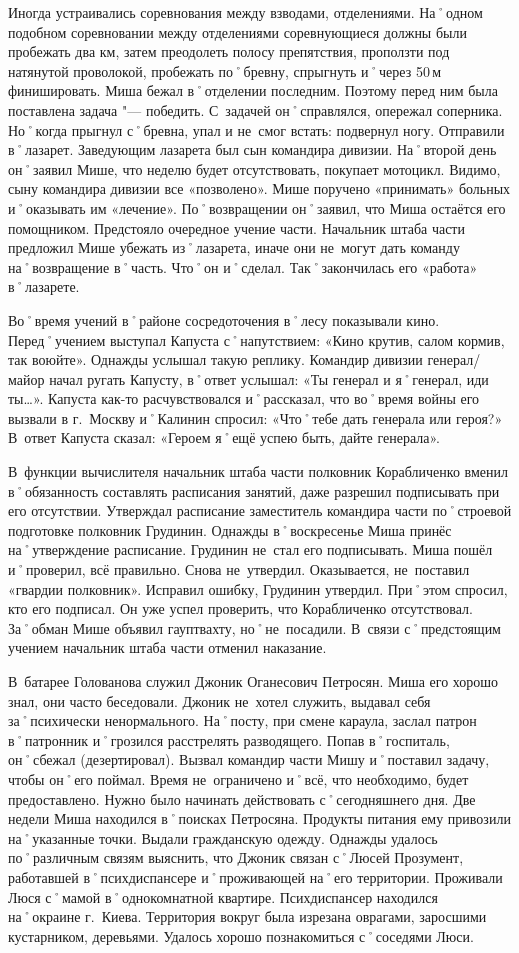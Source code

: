 Иногда устраивались соревнования между взводами, отделениями. На˚одном подобном соревновании между отделениями соревнующиеся должны были пробежать два км, затем преодолеть полосу препятствия, проползти под натянутой проволокой, пробежать по˚бревну, спрыгнуть и˚через 50\,м финишировать. Миша бежал в˚отделении последним. Поэтому перед ним была поставлена задача "--- победить. С~задачей он˚справлялся, опережал соперника. Но˚когда прыгнул с˚бревна, упал и не~смог встать: подвернул ногу. Отправили в˚лазарет. Заведующим лазарета был сын командира дивизии. На˚второй день он˚заявил Мише, что неделю будет отсутствовать, покупает мотоцикл. Видимо, сыну командира дивизии все «позволено». Мише поручено «принимать» больных и˚оказывать им «лечение». По˚возвращении он˚заявил, что Миша остаётся его помощником. Предстояло очередное учение части. Начальник штаба части предложил Мише убежать из˚лазарета, иначе они не~могут дать команду на˚возвращение в˚часть. Что˚он и˚сделал. Так˚закончилась его «работа» в˚лазарете.

Во˚время учений в˚районе сосредоточения в˚лесу показывали кино. Перед˚учением выступал Капуста с˚напутствием: «Кино крутив, салом кормив, так воюйте». Однажды услышал такую реплику. Командир дивизии генерал\-/майор начал ругать Капусту, в˚ответ услышал: «Ты генерал и я˚генерал, иди ты…». Капуста как-то расчувствовался и˚рассказал, что во˚время войны его вызвали в г.~Москву и˚Калинин спросил: «Что˚тебе дать генерала или героя?» В~ответ Капуста сказал: «Героем я˚ещё успею быть, дайте генерала». 

В~функции вычислителя начальник штаба части полковник Корабличенко вменил в˚обязанность составлять расписания занятий, даже разрешил подписывать при его отсутствии. Утверждал расписание заместитель командира части по˚строевой подготовке полковник Грудинин. Однажды в˚воскресенье Миша принёс на˚утверждение расписание. Грудинин не~стал его подписывать. Миша пошёл и˚проверил, всё правильно. Снова не~утвердил. Оказывается, не~поставил «гвардии полковник». Исправил ошибку, Грудинин утвердил. При˚этом спросил, кто его подписал. Он уже успел проверить, что Корабличенко отсутствовал. За˚обман Мише объявил гауптвахту, но˚не~посадили. В~связи с˚предстоящим учением начальник штаба части отменил наказание.


В~батарее Голованова служил Джоник Оганесович Петросян. Миша его хорошо знал, они часто беседовали. Джоник не~хотел служить, выдавал себя за˚психически ненормального. На˚посту, при смене караула, заслал патрон в˚патронник и˚грозился расстрелять разводящего. Попав в˚госпиталь, он˚сбежал (дезертировал). Вызвал командир части Мишу и˚поставил задачу, чтобы он˚его поймал. Время не~ограничено и˚всё, что необходимо, будет предоставлено. Нужно было начинать действовать с˚сегодняшнего дня. Две недели Миша находился в˚поисках Петросяна. Продукты питания ему привозили на˚указанные точки. Выдали гражданскую одежду. Однажды удалось по˚различным связям выяснить, что Джоник связан с˚Люсей Прозумент, работавшей в˚психдиспансере и˚проживающей на˚его территории. Проживали Люся с˚мамой в˚однокомнатной квартире. Психдиспансер находился на˚окраине г.~Киева. Территория вокруг была изрезана оврагами, заросшими кустарником, деревьями. Удалось хорошо познакомиться с˚соседями Люси. 

